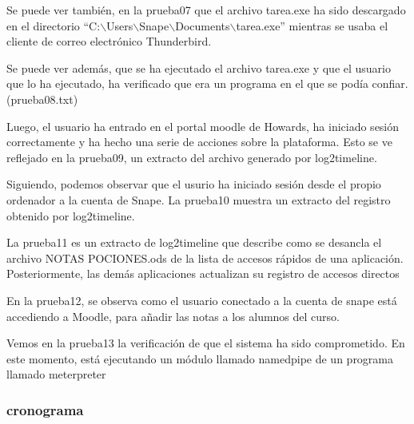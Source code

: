 Se puede ver también, en la prueba07 que el archivo tarea.exe ha sido descargado en el directorio ``C:$\backslash$Users$\backslash$Snape$\backslash$Documents$\backslash$tarea.exe'' mientras se usaba el cliente de correo electrónico Thunderbird.

Se puede ver además, que se ha ejecutado el archivo tarea.exe y que el usuario que lo ha ejecutado, ha verificado que era un programa en el que se podía confiar. (prueba08.txt)

Luego, el usuario ha entrado en el portal moodle de Howards, ha iniciado sesión correctamente y ha hecho una serie de acciones sobre la plataforma. Esto se ve reflejado en la prueba09, un extracto del archivo generado por log2timeline.

Siguiendo, podemos observar que el usurio ha iniciado sesión desde el propio ordenador a la cuenta de Snape.
La prueba10 muestra un extracto del registro obtenido por log2timeline.

La prueba11 es un extracto de log2timeline que describe como se desancla el archivo NOTAS POCIONES.ods de la lista de accesos rápidos de una aplicación.
Posteriormente, las demás aplicaciones actualizan su registro de accesos directos \cite{813711}

En la prueba12, se observa como el usuario conectado a la cuenta de snape está accediendo a Moodle, para añadir las notas a los alumnos del curso.

Vemos en la prueba13 la verificación de que el sistema ha sido comprometido.
En este momento, está ejecutando un módulo llamado namedpipe \cite{namedpipe} de un programa llamado meterpreter \cite{meterpreter}

\subsubsection{cronograma}

